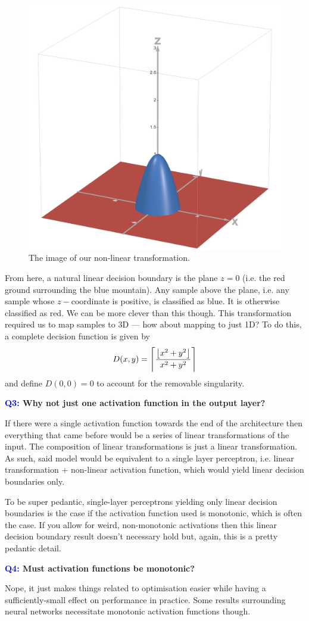 \documentclass[11pt]{article}
\begin{document}
\begin{figure}[ht]
    \centering
    \includegraphics[width=0.40\columnwidth]{./figures/neural_nets//NLA_non_lin_transform.png}
    \caption{The image of our non-linear transformation.}
    \label{fig:non_lin_transformation}
\end{figure}

From here, a natural linear decision boundary is the plane $z=0$ (i.e. the red ground surrounding the blue mountain). Any sample above the plane, i.e. any sample whose $z-$coordinate is positive, is classified as blue. It is otherwise classified as red. We can be more clever than this though. This transformation required us to map samples to 3D — how about mapping to just 1D? To do this, a complete decision function is given by
$$
D(x,y)=\left\lceil\frac{\left\lfloor x^2+y^2\right\rfloor}{x^2+y^2}\right\rceil
$$
and define $D(0,0)=0$ to account for the removable singularity.

\begin{center}
    \textbf{\textcolor{blue}{Q3:} Why not just one activation function in the output layer?}
\end{center}
If there were a single activation function towards the end of the architecture then everything that came before would be a series of linear transformations of the input. The composition of linear transformations is just a linear transformation. As such, said model would be equivalent to a single layer perceptron, i.e. linear transformation + non-linear activation function, which would yield linear decision boundaries only.

To be super pedantic, single-layer perceptrons yielding only linear decision boundaries is the case if the activation function used is monotonic, which is often the case. If you allow for weird, non-monotonic activations then this linear decision boundary result doesn't necessary hold but, again, this is a pretty pedantic detail.

\begin{center}
    \textbf{\textcolor{blue}{Q4:} Must activation functions be monotonic?}
\end{center}
Nope, it just makes things related to optimisation easier while having a sufficiently-small effect on performance in practice. Some results surrounding neural networks necessitate monotonic activation functions though.
\end{document}
